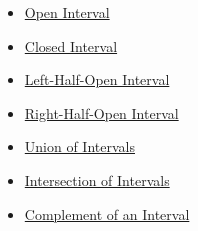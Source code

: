 \begin{dependencies}
\begin{itemize}
  \item \hyperref[def:open-interval]{Open Interval}
  \item \hyperref[def:closed-interval]{Closed Interval}
  \item \hyperref[def:left-half-open-interval]{Left-Half-Open Interval}
  \item \hyperref[def:right-half-open-interval]{Right-Half-Open Interval}
  \item \hyperref[def:union-of-intervals]{Union of Intervals}
  \item \hyperref[def:intersection-of-intervals]{Intersection of Intervals}
  \item \hyperref[def:complement-of-interval]{Complement of an Interval}
\end{itemize}
\end{dependencies}
